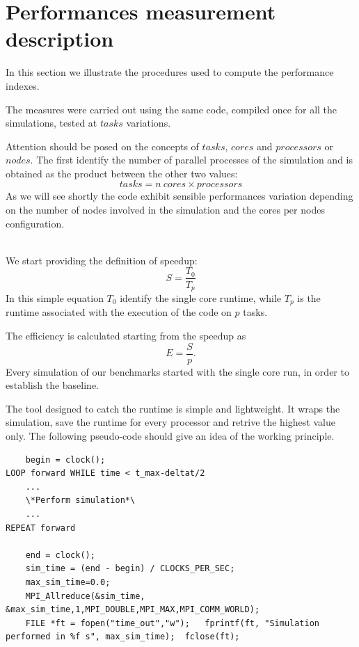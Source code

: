 \section{Performances measurement description}
In this section we illustrate the procedures used to compute the performance indexes.\par
The measures were carried out using the same code, compiled once for all the simulations, tested at $tasks$ variations.\par
Attention should be posed on the concepts of $tasks$, $cores$ and $processors$ or $nodes$. The first identify the number of parallel processes of the simulation and is obtained as the product between the other two values:
\begin{equation*}
tasks = n~cores \times processors
\end{equation*}
 As we will see shortly the code exhibit sensible performances variation depending on the number of nodes involved in the simulation and the cores per nodes configuration. \\~\par
We start providing the definition of speedup:
\begin{equation*}
S = \frac{T_{0}}{T_{p}}
\end{equation*}
In this simple equation $T_{0}$ identify the single core runtime, while $T_{p}$ is the runtime associated with the execution of the code on $p$ tasks. \par
The efficiency is calculated starting from the speedup as 
\begin{equation*}
E = \frac{S}{p}.
\end{equation*}
Every simulation of our benchmarks started with the single core run, in order to establish the baseline. \par
The tool designed to catch the runtime is simple and lightweight. It wraps the simulation, save the runtime for every processor and retrive the highest value only.
The following pseudo-code should give an idea of the working principle.

\begin{lstlisting}
	begin = clock();
LOOP forward WHILE time < t_max-deltat/2
	...
	\*Perform simulation*\
	...
REPEAT forward

	end = clock();
	sim_time = (end - begin) / CLOCKS_PER_SEC; 
	max_sim_time=0.0;
	MPI_Allreduce(&sim_time, &max_sim_time,1,MPI_DOUBLE,MPI_MAX,MPI_COMM_WORLD); 
	FILE *ft = fopen("time_out","w");	fprintf(ft, "Simulation performed in %f s", max_sim_time); 	fclose(ft);
\end{lstlisting}


